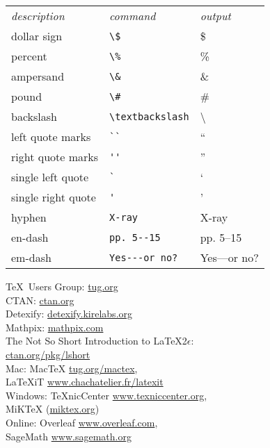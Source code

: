 \documentclass[10pt,landscape]{article}
\begin{document}
\begin{multicols}{3}
\begin{tabular}{lll}
\emph{description} & \emph{command} & \emph{output}\\
dollar sign & \verb!\$! & \$ \\
percent & \verb!\%! & \% \\
ampersand & \verb!\&! & \& \\
pound & \verb!\#! & \# \\
backslash & \verb!\textbackslash! & \textbackslash \\
left quote marks & \verb!``! & `` \\
right quote marks & \verb!''! & '' \\
single left quote  & \verb!`! & ` \\
single right quote  & \verb!'! & ' \\
hyphen & \verb!X-ray! & X-ray\\
en-dash & \verb!pp. 5--15! & pp. 5--15 \\
em-dash & \verb!Yes---or no?! & Yes---or no? 
\end{tabular}

\begin{tcolorbox}[resourcebox, title=Resources]
\small
\TeX\ Users Group: \url{tug.org}\\
CTAN: \url{ctan.org}\\
Detexify: \url{detexify.kirelabs.org}\\
Mathpix: \url{mathpix.com}\\
The Not So Short Introduction to LaTeX2$\epsilon$:\\ \hspace*{2em}\url{ctan.org/pkg/lshort}\\
Mac: MacTeX \url{tug.org/mactex},\\ \hspace*{2em}LaTeXiT \url{www.chachatelier.fr/latexit}\\
Windows: TeXnicCenter \url{www.texniccenter.org},\\ \hspace*{2em}MiKTeX (\url{miktex.org})\\
Online: Overleaf \url{www.overleaf.com},\\ \hspace*{2em}SageMath \url{www.sagemath.org}
\end{tcolorbox}
\end{multicols}
\end{document}
